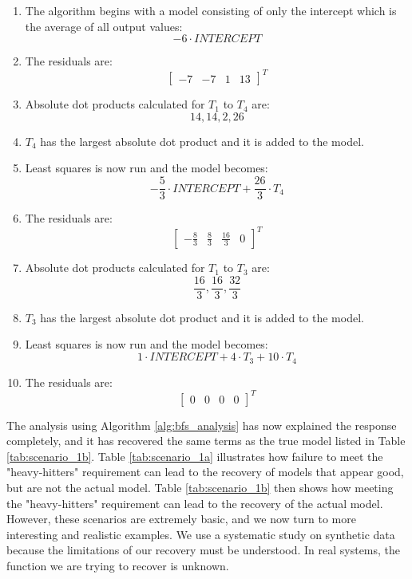 \begin{enumerate}
\item The algorithm begins with a model consisting of only the intercept which is the average of all output values:
	\[
		-6 \cdot \mathit{INTERCEPT}
	\]
\item The residuals are:
	\[
		{\begin{bmatrix} -7 & -7 & 1 & 13 \end{bmatrix}}^T
	\]
\item Absolute dot products calculated for $T_{1}$ to $T_{4}$ are:
	\[
		14, 14, 2, 26
	\]
\item $T_{4}$ has the largest absolute dot product and it is added to the model.
\item Least squares is now run and the model becomes:
	\[
		-\frac{5}{3} \cdot \mathit{INTERCEPT} + \frac{26}{3} \cdot T_{4}
	\]
\item The residuals are:
	\[
		{\begin{bmatrix} -\frac{8}{3} & \frac{8}{3} & \frac{16}{3} & 0 \end{bmatrix}}^T
	\]
\item Absolute dot products calculated for $T_{1}$ to $T_{3}$ are:
	\[
		\frac{16}{3}, \frac{16}{3}, \frac{32}{3}
	\]
\item $T_{3}$ has the largest absolute dot product and it is added to the model.
\item Least squares is now run and the model becomes:
	\[
		1 \cdot \mathit{INTERCEPT} + 4 \cdot T_{3} + 10 \cdot T_{4}
	\]
\item The residuals are:
	\[
		{\begin{bmatrix} 0 & 0 & 0 & 0 \end{bmatrix}}^T
	\]
\end{enumerate}

The analysis using Algorithm \ref{alg:bfs_analysis} has now explained the response completely, and it has recovered the same terms as the true model listed in Table \ref{tab:scenario_1b}.
Table \ref{tab:scenario_1a} illustrates how failure to meet the "heavy-hitters" requirement can lead to the recovery of models that appear good, but are not the actual model.
Table \ref{tab:scenario_1b} then shows how meeting the "heavy-hitters" requirement can lead to the recovery of the actual model.
However, these scenarios are extremely basic, and we now turn to more interesting and realistic examples.
We use a systematic study on synthetic data because the limitations of our recovery must be understood.
In real systems, the function we are trying to recover is unknown.

